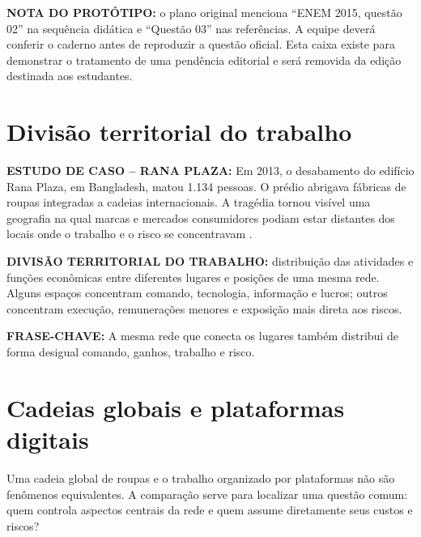\begin{notaeditorial}
\textbf{NOTA DO PROTÓTIPO:} o plano original menciona ``ENEM 2015, questão 02'' na sequência didática e ``Questão 03'' nas referências. A equipe deverá conferir o caderno antes de reproduzir a questão oficial. Esta caixa existe para demonstrar o tratamento de uma pendência editorial e será removida da edição destinada aos estudantes.
\end{notaeditorial}

\section{Divisão territorial do trabalho}

\begin{exemploconcreto}
\textbf{ESTUDO DE CASO -- RANA PLAZA:} Em 2013, o desabamento do edifício Rana Plaza, em Bangladesh, matou 1.134 pessoas. O prédio abrigava fábricas de roupas integradas a cadeias internacionais. A tragédia tornou visível uma geografia na qual marcas e mercados consumidores podiam estar distantes dos locais onde o trabalho e o risco se concentravam \citep{oxfam}.
\end{exemploconcreto}

\begin{conceito}
\textbf{DIVISÃO TERRITORIAL DO TRABALHO:} distribuição das atividades e funções econômicas entre diferentes lugares e posições de uma mesma rede. Alguns espaços concentram comando, tecnologia, informação e lucros; outros concentram execução, remunerações menores e exposição mais direta aos riscos.
\end{conceito}

\begin{frasechave}
\textbf{FRASE-CHAVE:} A mesma rede que conecta os lugares também distribui de forma desigual comando, ganhos, trabalho e risco.
\end{frasechave}

\section{Cadeias globais e plataformas digitais}

Uma cadeia global de roupas e o trabalho organizado por plataformas não são fenômenos equivalentes. A comparação serve para localizar uma questão comum: quem controla aspectos centrais da rede e quem assume diretamente seus custos e riscos?

